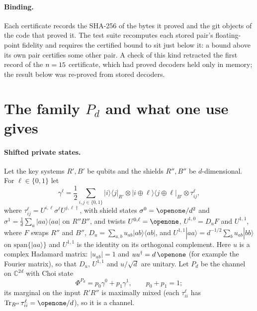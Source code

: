 \documentclass[aps,pra,twocolumn,superscriptaddress,nofootinbib,longbibliography,floatfix]{revtex4-2}
\newcommand{\ket}[1]{|#1\rangle}
\newcommand{\bra}[1]{\langle #1|}
\newcommand{\proj}[1]{|#1\rangle\langle #1|}
\newcommand{\tr}{\operatorname{Tr}}
\newcommand{\mes}{\varPhi}
\begin{document}
\paragraph*{Binding.} Each certificate records the SHA-256 of the bytes it proved and the git objects of the code that proved it. The test suite recomputes each stored pair's floating-point fidelity and requires the certified bound to sit just below it: a bound above its own pair certifies some other pair. A check of this kind retracted the first record of the $n=15$ certificate, which had proved decoders held only in memory; the result below was re-proved from stored decoders.

\section{The family $P_d$ and what one use gives}
\label{sec:family}

\paragraph*{Shifted private states.} Let the key systems $R',B'$ be qubits and the shields $R'',B''$ be $d$-dimensional. For $\ell\in\{0,1\}$ let
\begin{equation}
\label{eq:gamma}
\gamma^\ell=\frac12\sum_{i,j\in\{0,1\}}\ket{i}\!\bra{j}_{R'}\otimes\ket{i\oplus\ell}\!\bra{j\oplus\ell}_{B'}\otimes\tau^\ell_{ij},
\end{equation}
where $\tau^\ell_{ij}=U^{i,\ell}\sigma^\ell U^{j,\ell\dagger}$, with shield states $\sigma^0=\openone/d^2$ and $\sigma^1=\frac1d\sum_a\proj{aa}$ on $R''B''$, and twists $U^{0,\ell}=\openone$, $U^{1,0}=D_uF$ and $U^{1,1}$, where $F$ swaps $R''$ and $B''$, $D_u=\sum_{a,b}u_{ab}\proj{ab}$, and $U^{1,1}\ket{aa}=d^{-1/2}\sum_bu_{ab}\ket{bb}$ on $\mathrm{span}\{\ket{aa}\}$ and $U^{1,1}$ is the identity on its orthogonal complement. Here $u$ is a complex Hadamard matrix: $|u_{ab}|=1$ and $uu^\dagger=d\,\openone$ (for example the Fourier matrix), so that $D_u$, $U^{1,1}$ and $u/\sqrt d$ are unitary. Let $P_d$ be the channel on $\mathbb C^{2d}$ with Choi state
\begin{equation}
\label{eq:choi}
\mes^{P_d}=p_0\gamma^0+p_1\gamma^1,\qquad p_0+p_1=1;
\end{equation}
its marginal on the input $R'R''$ is maximally mixed (each $\tau^\ell_{ii}$ has $\tr_{B''}\tau^\ell_{ii}=\openone/d$), so it is a channel.
\end{document}
